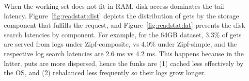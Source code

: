 
When the working set does not fit in RAM, disk access dominates the tail latency.
Figure~\ref{fig:readstat:dist} depicts the distribution of gets by the storage  component 
that fulfills the request, and Figure~\ref{fig:readstat:lat} presents the disk search latencies by component. 
For example, for the 64GB dataset, $3.3\%$ of gets are served from logs under Zipf-composite, vs $4.0\%$ under Zipf-simple,
and the respective log search latencies are $2.6$ ms vs $4.2$ ms. This happens because in the latter, puts are more dispersed, 
hence the funks are (1) cached less effectively by the OS, and (2) rebalanced less frequently so their logs grow longer.


